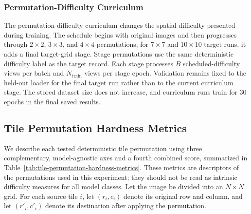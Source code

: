 \documentclass[12pt]{article}
\begin{document}
\subsubsection{Permutation-Difficulty Curriculum}

The permutation-difficulty curriculum changes the spatial difficulty presented during training. The schedule begins with original images and then progresses through $2 \times 2$, $3 \times 3$, and $4 \times 4$ permutations; for $7 \times 7$ and $10 \times 10$ target runs, it adds a final target-grid stage. Stage permutations use the same deterministic difficulty label as the target record. Each stage processes $B$ scheduled-difficulty views per batch and $N_{\mathrm{train}}$ views per stage epoch. Validation remains fixed to the held-out loader for the final target run rather than to the current curriculum stage. The stored dataset size does not increase, and curriculum runs train for 30 epochs in the final saved results.

\subsection{Tile Permutation Hardness Metrics}

We describe each tested deterministic tile permutation using three complementary, model-agnostic axes and a fourth combined score, summarized in Table~\ref{tab:tile-permutation-hardness-metrics}. These metrics are descriptors of the permutations used in this experiment; they should not be read as intrinsic difficulty measures for all model classes. Let the image be divided into an $N \times N$ grid. For each source tile $i$, let $(r_i, c_i)$ denote its original row and column, and let $(r'_i, c'_i)$ denote its destination after applying the permutation.
\end{document}
